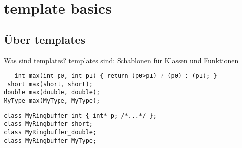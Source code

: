 \section{template basics}


\subsection{Über templates}

\begin{frame}[fragile]{Was sind templates?}
	templates sind: Schablonen für Klassen und Funktionen
	
	\pause
	
	\begin{lstlisting}
   int max(int p0, int p1) { return (p0>p1) ? (p0) : (p1); }
 short max(short, short);
double max(double, double);
MyType max(MyType, MyType);
	\end{lstlisting}
	
	\pause
	
	\begin{lstlisting}
class MyRingbuffer_int { int* p; /*...*/ };
class MyRingbuffer_short;
class MyRingbuffer_double;
class MyRingbuffer_MyType;
	\end{lstlisting}
\end{frame}

